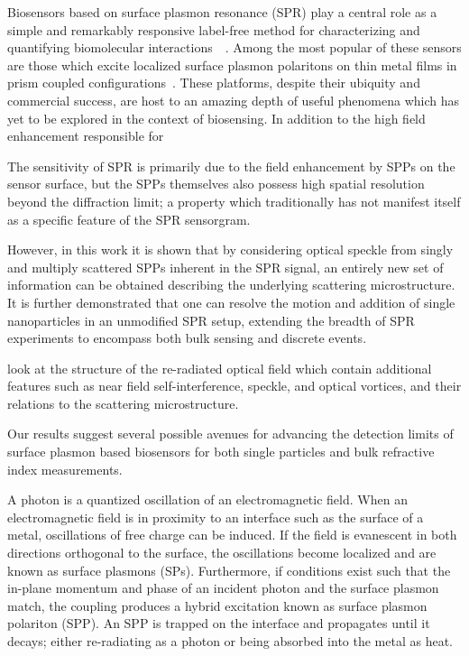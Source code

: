 


Biosensors based on surface plasmon resonance (SPR) play a central role as
a simple and remarkably responsive label-free method for characterizing and
quantifying biomolecular
interactions~\cite{homola1999surface}~\cite{homola2006surface}.  Among the
most popular of these sensors are those which excite localized surface
plasmon polaritons on thin metal films in prism coupled
configurations~\cite{hoa2007towards}.  These platforms, despite their
ubiquity and commercial success, are host to an amazing depth of useful
phenomena which has yet to be explored in the context of biosensing.  In
addition to the high field enhancement responsible for 

The
sensitivity of SPR is primarily due to the field enhancement by SPPs on the
sensor surface, but the SPPs themselves also possess high spatial
resolution beyond the diffraction limit; a property which traditionally has
not manifest itself as a specific feature of the SPR sensorgram.  

However, in this work it is shown that by considering optical speckle from
singly and multiply scattered SPPs inherent in the SPR signal, an entirely
new set of information can be obtained describing the underlying scattering
microstructure.  It is further demonstrated that one can resolve the motion
and addition of single nanoparticles in an unmodified SPR setup, extending
the breadth of SPR experiments to encompass both bulk sensing and discrete
events.



look at the structure of the re-radiated optical field which contain
additional features such as near field self-interference, speckle, and
optical vortices, and their relations to the scattering microstructure.

Our results suggest several possible avenues for advancing the detection
limits of surface plasmon based biosensors for both single particles and
bulk refractive index measurements.

A photon is a quantized oscillation of an electromagnetic field.  When an
electromagnetic  field is in proximity to an interface such as the surface
of a metal, oscillations of free charge can be induced.  If the field is
evanescent in both directions orthogonal to the surface, the oscillations
become localized and are known as surface plasmons (SPs).  Furthermore, if
conditions exist such that the in-plane momentum and phase of an incident
photon and the surface plasmon match, the coupling produces a hybrid
excitation known as surface plasmon polariton (SPP).  An SPP is trapped on
the interface and propagates until it decays; either re-radiating as a
photon or being absorbed into the metal as heat.

